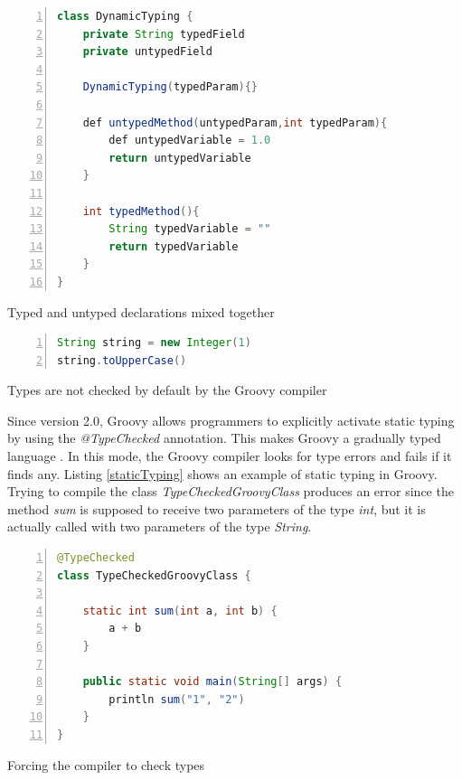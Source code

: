 \documentclass[]{sigplanconf}
\begin{document}
\begin{Listing}[ht]
\begin{lstlisting}[basicstyle=\footnotesize\ttfamily, language=Java,tabsize=2,breaklines=true,numbers=left,morekeywords={def}]
class DynamicTyping {
	private String typedField
	private untypedField

	DynamicTyping(typedParam){}

	def untypedMethod(untypedParam,int typedParam){
		def untypedVariable = 1.0
		return untypedVariable
	}

	int typedMethod(){
		String typedVariable = ""
		return typedVariable
	}
}
\end{lstlisting}
\caption{Typed and untyped declarations mixed together}
\label{dynamicTyping}
\end{Listing}

\begin{Listing}[ht]
\begin{lstlisting}[basicstyle=\footnotesize\ttfamily, language=Java,tabsize=2,breaklines=true,numbers=left]
String string = new Integer(1)
string.toUpperCase()
\end{lstlisting}
\caption{Types are not checked by default by the Groovy compiler}
\label{typeError}
\end{Listing}

Since version 2.0, Groovy allows programmers to explicitly activate static typing by using the \emph{@TypeChecked} annotation.
This makes Groovy a gradually typed language \cite{gray05,gray08,gray11,siek07,takikawa12}.
In this mode, the Groovy compiler looks for type errors and fails if it finds any.
Listing \ref{staticTyping} shows an example of static typing in Groovy.
Trying to compile the class \emph{TypeCheckedGroovyClass} produces an error since the method \emph{sum} is supposed to receive two parameters of the type \emph{int}, but it is actually called with two parameters of the type \emph{String}.

\begin{Listing}[ht]
\begin{lstlisting}[basicstyle=\footnotesize\ttfamily, language=Java,tabsize=2,breaklines=true,numbers=left]
@TypeChecked
class TypeCheckedGroovyClass {
	
	static int sum(int a, int b) {
		a + b
	}

	public static void main(String[] args) {
		println sum("1", "2")
	}
}
\end{lstlisting}
\caption{Forcing the compiler to check types}
\label{staticTyping}
\end{Listing}
\end{document}
